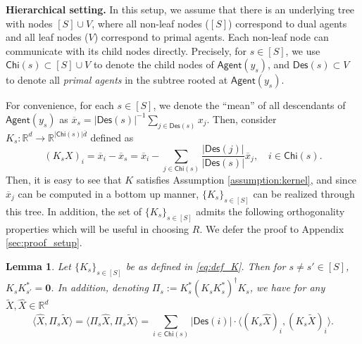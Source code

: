 \documentclass[10pt]{article}
\newcommand{\mb}{\mathbf}
\newcommand{\R}{\mathbb{R}}
\newcommand{\agent}{\mathsf{Agent}}
\newcommand{\child}{\mathsf{Chi}}
\newcommand{\Descendant}{\mathsf{Des}}
\newtheorem{lemma}{Lemma}[section]
\begin{document}
\textbf{Hierarchical setting.} In this setup, we assume that there is an underlying tree with nodes $[S]\cup V$, where all non-leaf nodes ($[S]$) correspond to dual agents and all leaf nodes ($V$) correspond to primal agents. Each non-leaf node can communicate with its child nodes directly. Precisely, for $s\in [S]$, we use $\child(s) \subset [S]\cup V$ to denote the child nodes of $\agent(y_s)$, and $\Descendant(s)\subset V$ to denote all \textit{primal agents} in the subtree rooted at $\agent(y_s)$. 

For convenience, for each $s\in [S]$, we denote the ``mean'' of all descendants of $\agent(y_s)$ as $\overline{x}_s = |\Descendant(s)|^{-1}\sum_{j\in \Descendant(s)} x_j$. Then, consider $K_s:\R^{d}\to \R^{|\child(s)|{\overline{d}}}$ defined as 
\begin{equation}\label{eq:def_K}
    (K_sX)_{i}= \overline{x}_i - \overline{x}_s = \overline{x}_i - \sum_{j\in \child(s)}\frac{|\Descendant(j)|}{|\Descendant(s)|}\overline{x}_j,\quad i\in \child(s).
\end{equation}
Then, it is easy to see that $K$ satisfies Assumption \ref{assumption:kernel}, and since $\overline{x}_j$ can be computed in a bottom up manner, $\{K_s\}_{s\in [S]}$ can be realized through this tree. In addition, the set of $\{K_s\}_{s\in [S]}$ admits the following orthogonality properties which will be useful in choosing $R$. We defer the proof to Appendix \ref{sec:proof_setup}. 
\begin{lemma}\label{lm:K_prop}
    Let $\{K_s\}_{s\in [S]}$ be as defined in \eqref{eq:def_K}. Then for $s\neq s'\in [S]$, $K_sK_{s'}^* = \mb 0$. In addition, denoting $\Pi_s := K_s^*(K_sK_s^*)^{\dagger}K_s$, we have for any $\widetilde{X},\widehat{X}\in \R^{d}$
    \begin{displaymath}
        \langle \widehat{X},\Pi_s\widetilde{X}\rangle=\langle \Pi_s\widehat{X},\Pi_s\widetilde{X}\rangle= \sum_{i\in \child(s)} |\Descendant(i)| \cdot \langle (K_s\widehat{X})_i,(K_s\widetilde{X})_i\rangle.
    \end{displaymath}
\end{lemma}
\end{document}
